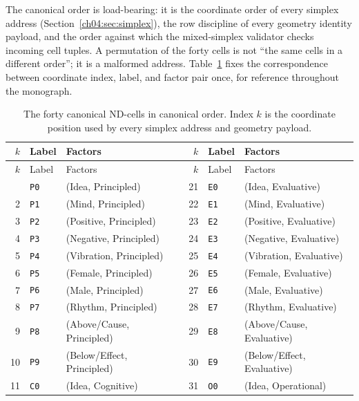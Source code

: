 The canonical order is load-bearing: it is the coordinate order of every
simplex address (Section~\ref{ch04:sec:simplex}), the row discipline of
every geometry identity payload, and the order against which the mixed-simplex
validator checks incoming cell tuples. A permutation of the forty cells is
not ``the same cells in a different order''; it is a malformed address.
Table~\ref{ch04:tab:cells} fixes the correspondence between coordinate
index, label, and factor pair once, for reference throughout the
monograph.

\begin{longtable}{@{}rllcrll@{}}
\caption{The forty canonical ND-cells in canonical order. Index $k$ is the
coordinate position used by every simplex address and geometry payload.}
\label{ch04:tab:cells}\\
\toprule
$k$ & Label & Factors & \hspace{2em} & $k$ & Label & Factors \\
\midrule
\endfirsthead
\toprule
$k$ & Label & Factors & \hspace{2em} & $k$ & Label & Factors \\
\midrule
\endhead
\bottomrule
\endfoot
1 & \texttt{P0} & (Idea, Principled) & & 21 & \texttt{E0} & (Idea, Evaluative) \\
2 & \texttt{P1} & (Mind, Principled) & & 22 & \texttt{E1} & (Mind, Evaluative) \\
3 & \texttt{P2} & (Positive, Principled) & & 23 & \texttt{E2} & (Positive, Evaluative) \\
4 & \texttt{P3} & (Negative, Principled) & & 24 & \texttt{E3} & (Negative, Evaluative) \\
5 & \texttt{P4} & (Vibration, Principled) & & 25 & \texttt{E4} & (Vibration, Evaluative) \\
6 & \texttt{P5} & (Female, Principled) & & 26 & \texttt{E5} & (Female, Evaluative) \\
7 & \texttt{P6} & (Male, Principled) & & 27 & \texttt{E6} & (Male, Evaluative) \\
8 & \texttt{P7} & (Rhythm, Principled) & & 28 & \texttt{E7} & (Rhythm, Evaluative) \\
9 & \texttt{P8} & (Above/Cause, Principled) & & 29 & \texttt{E8} & (Above/Cause, Evaluative) \\
10 & \texttt{P9} & (Below/Effect, Principled) & & 30 & \texttt{E9} & (Below/Effect, Evaluative) \\
11 & \texttt{C0} & (Idea, Cognitive) & & 31 & \texttt{O0} & (Idea, Operational) \\

\end{longtable}

